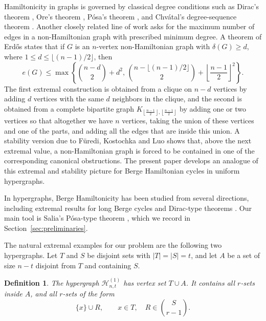 \documentclass[12pt]{article}
\newtheorem{definition}[theorem]{Definition}
\newcommand{\Hcal}{\mathcal H}
\begin{document}
Hamiltonicity in graphs is governed by classical degree conditions such as
Dirac's theorem \cite{Dirac_1952}, Ore's theorem \cite{Ore_1959},
P\'osa's theorem \cite{Posa_1962}, and Chv\'atal's degree-sequence
theorem \cite{Chvatal_1972}.  Another closely related line of work asks
for the maximum number of edges in a non-Hamiltonian graph with prescribed
minimum degree.  A theorem of Erd\H{o}s \cite{Erdos_1962_Remarks} states
that if $G$ is an $n$-vertex non-Hamiltonian graph with
$\delta(G)\ge d$, where $1\le d\le \lfloor(n-1)/2\rfloor$, then
$$
        e(G)\le
        \max\left\{
        \binom{n-d}{2}+d^2,\,
        \binom{n-\lfloor(n-1)/2\rfloor}{2}
        +\left\lfloor\frac{n-1}{2}\right\rfloor^2
        \right\}.
$$
The first extremal construction is obtained from a clique on $n-d$
vertices by adding $d$ vertices with the same $d$ neighbors in the
clique, and the second is 
obtained from a complete bipartite graph $K_{\left\lfloor\frac{n-1}{2}\right\rfloor,\left\lfloor\frac{n-1}{2}\right\rfloor}$ by adding one or two vertices so that altogether we have $n$ vertices, taking the union of these vertices and one of the parts, and adding all the edges that are inside this union.
A stability
version due to F\"uredi, Kostochka and Luo
\cite{Furedi_Kostochka_Luo_2017} shows that, above the next extremal
value, a non-Hamiltonian graph is forced to be contained in one of the
corresponding canonical obstructions.  The present paper develops an
analogue of this extremal and stability picture for Berge Hamiltonian
cycles in uniform hypergraphs.

In hypergraphs, Berge Hamiltonicity has been studied from several
directions, including extremal results for long Berge cycles
\cite{Furedi_Kostochka_Luo_2019,Furedi_Kostochka_Luo_2020,Furedi_Kostochka_Luo_2021}
and Dirac-type theorems \cite{Kostochka_Luo_McCourt_2024}.  Our main tool
is Salia's P\'osa-type theorem \cite{Salia_2024}, which we record in
Section~\ref{sec:preliminaries}.

The natural extremal examples for our problem are the following two
hypergraphs.  Let $T$ and $S$ be disjoint sets with $|T|=|S|=t$, and let
$A$ be a set of size $n-t$ disjoint from $T$ and containing $S$.

\begin{definition}
The hypergraph $\Hcal^{(1)}_{n,t}$ has vertex set $T\cup A$.  It contains
all $r$-sets inside $A$, and all $r$-sets of the form
$$
        \{x\}\cup R,\qquad x\in T,\quad R\in\binom{S}{r-1}.
$$
\end{definition}
\end{document}
